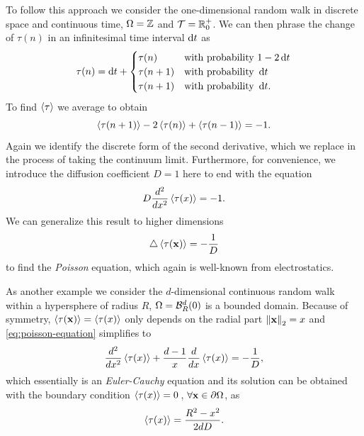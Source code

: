 To follow this approach we consider the one-dimensional random walk in discrete space and continuous time, \ie $\Omega = \operatorname{\mathbb{Z}}$ and \mbox{$\mathcal{T} = \operatorname{\mathbb{R}}_0^+$}. We can then phrase the change of $\tau(n)$ in an infinitesimal time interval $\mathop{}\!\mathrm{d} t$ as
\begin{equation*}
 \tau(n) = \mathop{}\!\mathrm{d} t +
 \begin{cases}
  \tau(n) & \textrm{with probability } 1-2\mathop{}\!\mathrm{d} t \\
  \tau(n+1) & \textrm{with probability } \mathop{}\!\mathrm{d} t \\
  \tau(n+1) & \textrm{with probability } \mathop{}\!\mathrm{d} t.
 \end{cases}
\end{equation*}
To find $\left<\tau\right>$ we average to obtain
\begin{equation*}
 \left<\tau(n+1)\right> -2 \left<\tau(n)\right> + \left<\tau(n-1)\right> = -1.
\end{equation*}
Again we identify the discrete form of the second derivative, which we replace in the process of taking the continuum limit. Furthermore, for convenience, we introduce the diffusion coefficient $D=1$ here to end with the equation
\begin{equation*}
 D \dfrac{d^2}{dx^2} \left<\tau(x)\right> = -1.
\end{equation*}
We can generalize this result to higher dimensions
\begin{equation}\label{eq:poisson-equation}
 \mathop{}\!\mathbin\bigtriangleup \left<\tau(\mathbf{x})\right> = -\frac{1}{D}
\end{equation}
to find the \textit{Poisson} equation, which again is well-known from electrostatics.

As another example we consider the $d$-dimensional continuous random walk within a hypersphere of radius $R$, \ie $\Omega = \mathcal{B}_R^d(0)$ is a bounded domain. Because of symmetry, $\left<\tau(\mathbf{x})\right> = \left<\tau(x)\right>$ only depends on the radial part $\left\|\mathbf{x}\right\|_2 = x$ and \autoref{eq:poisson-equation} simplifies to
\begin{equation*}
 \frac{d^2}{dx^2} \left<\tau(x)\right> + \frac{d-1}{x} \frac{d}{dx} \left<\tau(x)\right> = -\frac{1}{D},
\end{equation*}
which essentially is an \textit{Euler-Cauchy} equation and its solution can be obtained with the boundary condition $\left<\tau(x)\right> = 0 \,$, $\forall \mathbf{x} \in \partial \Omega$, as
\begin{equation*}
 \left<\tau(x)\right> = \frac{R^2 - x^2}{2 d D}.
\end{equation*}

\bigskip

